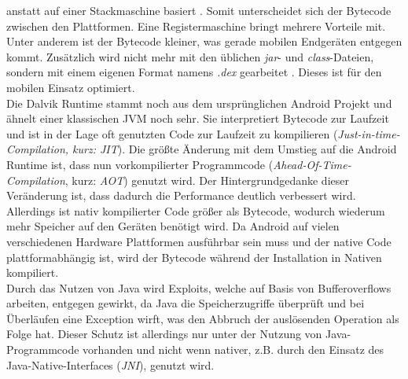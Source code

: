 	anstatt auf einer Stackmaschine basiert \cite{DalvikBytecode}. Somit
	unterscheidet sich der Bytecode zwischen den Plattformen. Eine
	Registermaschine bringt mehrere Vorteile mit. Unter anderem ist der Bytecode
	kleiner, was gerade mobilen Endgeräten entgegen kommt.
	Zusätzlich wird nicht mehr mit den üblichen \textit{jar}- und
	\textit{class}-Dateien, sondern mit einem eigenen Format namens \textit{.dex}
	gearbeitet \cite{DexFormat}. Dieses ist für den mobilen Einsatz optimiert.\\
	Die Dalvik Runtime stammt noch aus dem ursprünglichen Android Projekt und
	ähnelt einer klassischen JVM noch sehr. Sie interpretiert Bytecode zur
	Laufzeit und ist in der Lage oft genutzten Code zur Laufzeit zu kompilieren
	(\textit{Just-in-time-Compilation, kurz: JIT}).
	Die größte Änderung mit dem Umstieg auf die Android Runtime ist, dass nun
	vorkompilierter Programmcode (\textit{Ahead-Of-Time-Compilation}, kurz:
	\textit{AOT}) genutzt wird. Der Hintergrundgedanke dieser Veränderung ist,
	dass dadurch die Performance deutlich verbessert wird. Allerdings ist nativ
	kompilierter Code größer als Bytecode, wodurch wiederum mehr Speicher auf den
	Geräten benötigt wird. Da Android auf vielen verschiedenen Hardware
	Plattformen ausführbar sein muss und der native Code plattformabhängig ist,
	wird der Bytecode während der Installation in Nativen kompiliert.\\
	Durch das Nutzen von Java wird Exploits, welche auf Basis von Bufferoverflows
	arbeiten, entgegen gewirkt, da Java die Speicherzugriffe überprüft und bei
	Überläufen eine Exception wirft, was den Abbruch der auslösenden Operation als
	Folge hat. Dieser Schutz ist allerdings nur unter der Nutzung von
	Java-Programmcode vorhanden und nicht wenn nativer, z.B. durch den Einsatz des
	Java-Native-Interfaces (\textit{JNI}), genutzt wird.
